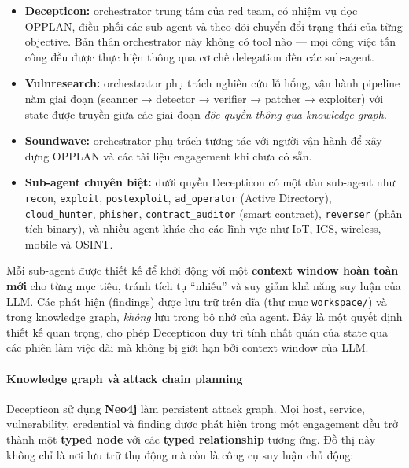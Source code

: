 \begin{itemize}
    \item \textbf{Decepticon:} orchestrator trung tâm của red team, có nhiệm vụ đọc OPPLAN, điều phối các sub-agent và theo dõi chuyển đổi trạng thái của từng objective. Bản thân orchestrator này không có tool nào — mọi công việc tấn công đều được thực hiện thông qua cơ chế delegation đến các sub-agent.
    \item \textbf{Vulnresearch:} orchestrator phụ trách nghiên cứu lỗ hổng, vận hành pipeline năm giai đoạn (scanner → detector → verifier → patcher → exploiter) với state được truyền giữa các giai đoạn \emph{độc quyền thông qua knowledge graph}.
    \item \textbf{Soundwave:} orchestrator phụ trách tương tác với người vận hành để xây dựng OPPLAN và các tài liệu engagement khi chưa có sẵn.
    \item \textbf{Sub-agent chuyên biệt:} dưới quyền Decepticon có một dàn sub-agent như \texttt{recon}, \texttt{exploit}, \texttt{postexploit}, \texttt{ad\_operator} (Active Directory), \texttt{cloud\_hunter}, \texttt{phisher}, \texttt{contract\_auditor} (smart contract), \texttt{reverser} (phân tích binary), và nhiều agent khác cho các lĩnh vực như IoT, ICS, wireless, mobile và OSINT.
\end{itemize}

Mỗi sub-agent được thiết kế để khởi động với một \textbf{context window hoàn toàn mới} cho từng mục tiêu, tránh tích tụ ``nhiễu'' và suy giảm khả năng suy luận của LLM. Các phát hiện (findings) được lưu trữ trên đĩa (thư mục \texttt{workspace/}) và trong knowledge graph, \emph{không} lưu trong bộ nhớ của agent. Đây là một quyết định thiết kế quan trọng, cho phép Decepticon duy trì tính nhất quán của state qua các phiên làm việc dài mà không bị giới hạn bởi context window của LLM.

\paragraph{Knowledge graph và attack chain planning}

Decepticon sử dụng \textbf{Neo4j} làm persistent attack graph. Mọi host, service, vulnerability, credential và finding được phát hiện trong một engagement đều trở thành một \textbf{typed node} với các \textbf{typed relationship} tương ứng. Đồ thị này không chỉ là nơi lưu trữ thụ động mà còn là công cụ suy luận chủ động:

